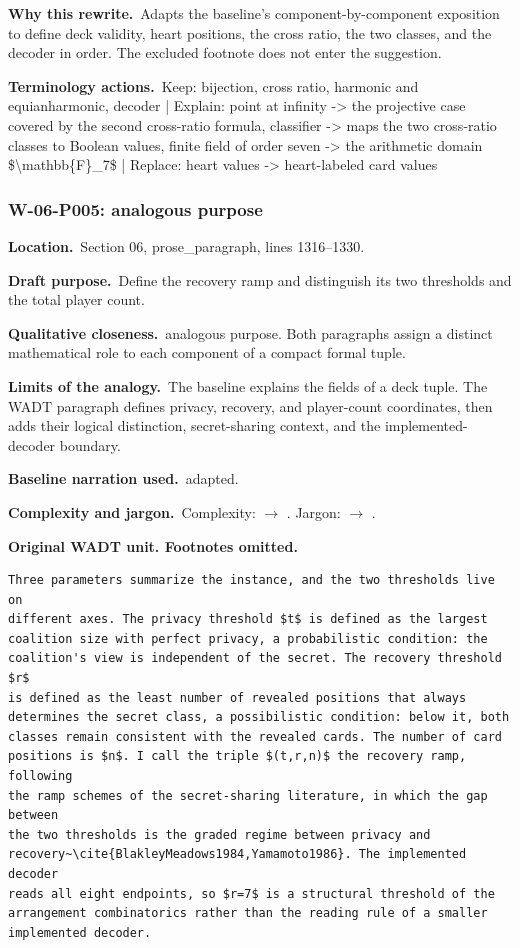 \documentclass[10pt]{article}
\renewcommand{\cite}[1]{\textnormal{[\texttt{\detokenize{#1}}]}}\renewcommand{\label}[1]{}
\newcommand{\Field}[2]{\textbf{#1}\ #2\par}\newcommand{\Tag}[1]{\fcolorbox{black!25}{black!4}{\strut\scriptsize #1}}
\begin{document}
\Field{Why this rewrite.}{Adapts the baseline's component-by-component exposition to define deck validity, heart positions, the cross ratio, the two classes, and the decoder in order. The excluded footnote does not enter the suggestion.}
\Field{Terminology actions.}{Keep: bijection, cross ratio, harmonic and equianharmonic, decoder | Explain: point at infinity -> the projective case covered by the second cross-ratio formula, classifier -> maps the two cross-ratio classes to Boolean values, finite field of order seven -> the arithmetic domain \$\textbackslash{}mathbb\{F\}\_7\$ | Replace: heart values -> heart-labeled card values}
\par\smallskip
{}\subsubsection*{W-06-P005: analogous purpose}
\Field{Location.}{Section 06, prose\_paragraph, lines 1316--1330.}
\Field{Draft purpose.}{Define the recovery ramp and distinguish its two thresholds and the total player count.}
\Field{Qualitative closeness.}{analogous purpose. Both paragraphs assign a distinct mathematical role to each component of a compact formal tuple.}
\Field{Limits of the analogy.}{The baseline explains the fields of a deck tuple. The WADT paragraph defines privacy, recovery, and player-count coordinates, then adds their logical distinction, secret-sharing context, and the implemented-decoder boundary.}
\Field{Baseline narration used.}{adapted.}
\Field{Complexity and jargon.}{Complexity: \Tag{high} $\rightarrow$ \Tag{medium}. Jargon: \Tag{high} $\rightarrow$ \Tag{medium}.}
\textbf{Original WADT unit. Footnotes omitted.}
\begin{lstlisting}
Three parameters summarize the instance, and the two thresholds live on
different axes. The privacy threshold $t$ is defined as the largest
coalition size with perfect privacy, a probabilistic condition: the
coalition's view is independent of the secret. The recovery threshold $r$
is defined as the least number of revealed positions that always
determines the secret class, a possibilistic condition: below it, both
classes remain consistent with the revealed cards. The number of card
positions is $n$. I call the triple $(t,r,n)$ the recovery ramp, following
the ramp schemes of the secret-sharing literature, in which the gap between
the two thresholds is the graded regime between privacy and
recovery~\cite{BlakleyMeadows1984,Yamamoto1986}. The implemented decoder
reads all eight endpoints, so $r=7$ is a structural threshold of the
arrangement combinatorics rather than the reading rule of a smaller
implemented decoder.
\end{lstlisting}
\end{document}
